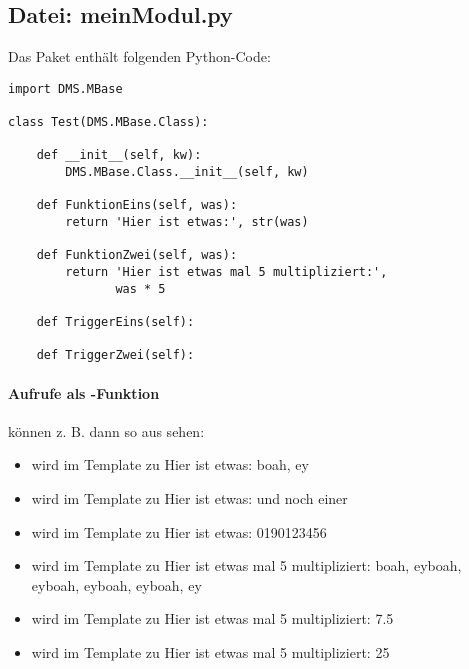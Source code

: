\subsection{Datei: meinModul.py}

Das Paket  enth\"alt folgenden Python-Code:

\begin{verbatim}
import DMS.MBase

class Test(DMS.MBase.Class):

    def __init__(self, kw):
        DMS.MBase.Class.__init__(self, kw)

    def FunktionEins(self, was):
        return 'Hier ist etwas:', str(was)

    def FunktionZwei(self, was):
        return 'Hier ist etwas mal 5 multipliziert:',
               was * 5

    def TriggerEins(self):

    def TriggerZwei(self):

\end{verbatim}

\paragraph{Aufrufe als -Funktion} k\"onnen z. B. dann so
aus sehen:

\begin{itemize}
\item {}
  wird im Template zu Hier ist etwas: boah, ey
\item {} wird im Template zu Hier ist etwas: und noch einer
\item {}
  wird im Template zu Hier ist etwas: 0190123456
\end{itemize}

\begin{itemize}
\item {}
  wird im Template zu Hier ist etwas mal 5 multipliziert: boah,
  eyboah, eyboah, eyboah, eyboah, ey
\item {} wird im
  Template zu Hier ist etwas mal 5 multipliziert: 7.5
\item {} wird im
  Template zu Hier ist etwas mal 5 multipliziert: 25
\end{itemize}
